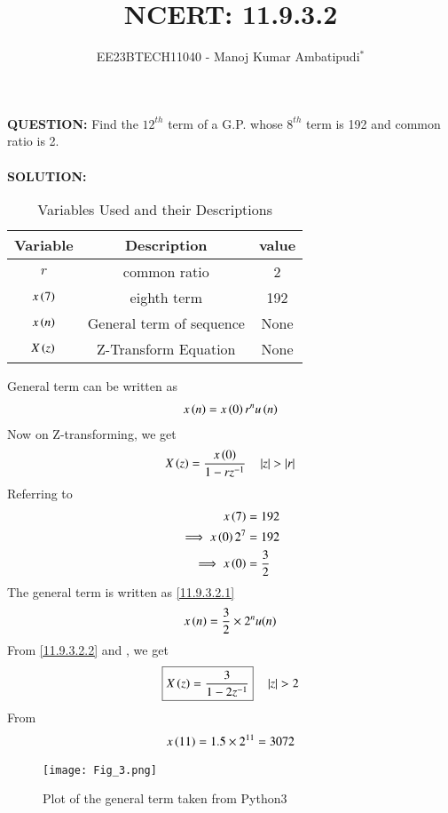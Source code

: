 \documentclass[journal,12pt,twocolumn]{IEEEtran}
\theoremstyle{remark}
\begin{document}

\vspace{3cm}
\title{NCERT: 11.9.3.2}
\author{EE23BTECH11040 - Manoj Kumar Ambatipudi$^{*}$%
}
\maketitle
\newpage
\bigskip
\renewcommand{\thefigure}{\theenumi}
\renewcommand{\thetable}{\theenumi}
\textbf{QUESTION:}
Find the $12^{th}$ term of a G.P. whose $8^{th}$ term is 192 and common ratio is 2.\\\\
\textbf{SOLUTION:}
\begin{table}[h!!]
\renewcommand\thetable{1}
    \centering
    \begin{tabular}{|c|c|c|}
    \hline
        Variable&             Description&value\\\hline
             $r$&            common ratio&2    \\\hline
     $x\left(7\right)$&              eighth term&192  \\\hline
     $x\left(n\right)$&General term of sequence&None \\\hline
     $X\left(z\right)$&    Z-Transform Equation&None \\\hline
    \end{tabular}
    \caption{Variables Used and their Descriptions}
    \label{tab 11.9.3.2.1}
\end{table}


General term can be written as 
\begin{align}
    x\left(n\right)=x\left(0\right)r^{n}u\left(n\right)\label{11.9.3.2.1}
\end{align}
Now on Z-transforming, we get
\begin{align}
    X\left(z\right)=\frac{x\left(0\right)}{1-rz^{-1}}\label{11.9.3.2.2} \quad   \left\vert z\right\vert>\left\vert r\right\vert
\end{align}
Referring to 
\begin{align}
         x\left(7\right)&=192\\
\implies x\left(0\right)2^{7}&=192\\
\implies x\left(0\right)&=\frac{3}{2}
\end{align}
The general term is written as \eqref{11.9.3.2.1}
\begin{align}
    x\left(n\right)=\frac{3}{2}\times2^{n}u(n)
\end{align}
From \eqref{11.9.3.2.2} and , we get
\begin{align}
   \boxed{X\left(z\right)=\frac{3}{1-2z^{-1}}}\quad   \left\vert z\right\vert>2
\end{align}
From  
\begin{align}
x\left(11\right) = 1.5\times2^{11} = 3072
\end{align}
\begin{figure}[h]
\renewcommand\thefigure{1} 
    \centering
    \texttt{[image: Fig\_3.png]}
    \caption{Plot of the general term taken from Python3}
    \label{fig:1}
\end{figure}
\end{document}
